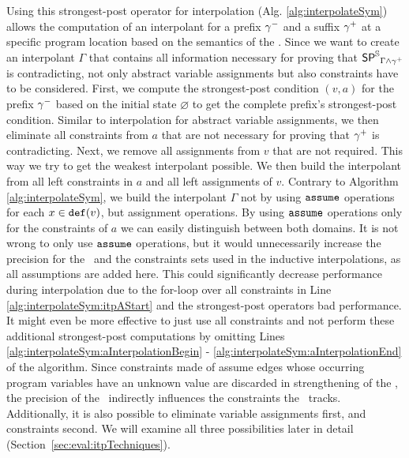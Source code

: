 Using this strongest-post operator for interpolation (Alg. \ref{alg:interpolateSym}) allows the computation of an interpolant for a prefix ${\gamma^{-}}$ and a suffix ${\gamma^{+}}$ at a specific program location based on the semantics of the \symbolicExecutionCPA.
Since we want to create an interpolant $\Gamma$ that contains all information necessary for proving that $\operatorname{\operatorname{\operatorname{\mathsf{SP}}}^{\mathbb{S}}}_{\Gamma \wedge {\gamma^{+}}}$ is contradicting, not only abstract variable assignments but also constraints have to be considered.
First, we compute the strongest-post condition $(v, a)$ for the prefix ${\gamma^{-}}$ based on the initial state $\varnothing$ to get the complete prefix's strongest-post condition.
Similar to interpolation for abstract variable assignments, we then eliminate all constraints from $a$ that are not necessary for proving that ${\gamma^{+}}$ is contradicting.
Next, we remove all assignments from $v$ that are not required. This way we try to get the weakest interpolant possible.
We then build the interpolant from all left constraints in $a$ and all left assignments of $v$.
Contrary to Algorithm \ref{alg:interpolateSym}, we build the interpolant $\Gamma$ not by using $\texttt{assume}$ operations for each $x \in \texttt{def}(v)$, but assignment operations.
By using $\texttt{assume}$ operations only for the constraints of $a$ we can easily distinguish between both domains.
It is not wrong to only use $\texttt{assume}$ operations, but it would unnecessarily increase the precision for the \constraintsCPA\ and the constraints sets used in the inductive interpolations, as all assumptions are added here.
This could significantly decrease performance during interpolation due to the for-loop over all constraints in Line \ref{alg:interpolateSym:itpAStart} and the strongest-post operators bad performance.
It might even be more effective to just use all constraints and not perform these additional strongest-post computations
by omitting Lines \ref{alg:interpolateSym:aInterpolationBegin} - \ref{alg:interpolateSym:aInterpolationEnd} of the algorithm.
Since constraints made of assume edges whose occurring program variables have an unknown value are discarded in strengthening of the \constraintsCPA, the precision of the \ indirectly influences the constraints the \constraintsCPA\ tracks.
Additionally, it is also possible to eliminate variable assignments first, and constraints second.
We will examine all three possibilities later in detail (Section~\ref{sec:eval:itpTechniques}). 

